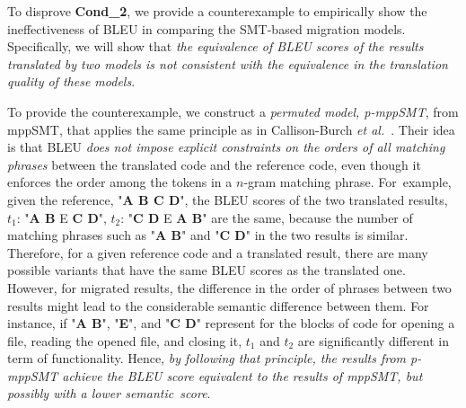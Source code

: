 To disprove {\bf Cond\_2}, we provide a counterexample to empirically
show the ineffectiveness of BLEU in comparing the SMT-based migration
models. Specifically, we will show that {\em the equivalence of BLEU
  scores of the results translated by two models is not consistent
  with the equivalence in the translation quality of these models}.

To provide the counterexample, we construct a {\em permuted model,
  p-mppSMT}, from mppSMT, that applies the same principle as in
Callison-Burch {\em et al.}~\cite{Callison}. Their idea is that BLEU
{\em does not impose explicit constraints on the orders of all
  matching phrases} between the translated code and the reference
code, even though it enforces the order among the tokens in a $n$-gram 
matching phrase. 
%
For~example, given the reference, "\textbf{A B C D}", the BLEU scores
of the two translated results, $t_1$: "\textbf{A B} E \textbf{C D}",
$t_2$: "\textbf{C D} E \textbf{A B}" are the same, because the number
of matching phrases such as "{\bf A B}" and "{\bf C D}" in the two results is
similar. Therefore, for a given reference code and a translated
result, there are many possible variants that have the same BLEU
scores as the translated one. However, for migrated results,
the difference in the order of phrases between two results might lead
to the considerable semantic difference between them. For
instance, if "\textbf{A B}", "\textbf{E}", and "\textbf{C D}"
represent for the blocks of code for opening a file, reading the opened
file, and closing it, $t_1$ and $t_2$ are significantly
different in term of functionality. Hence, {\em by following that
  principle, the results from p-mppSMT achieve the BLEU score equivalent
  to the results of mppSMT, but possibly with a lower semantic~score}.

